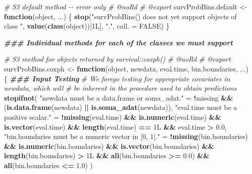 \documentclass[
]{book}
\newenvironment{Shaded}{\begin{snugshade}}{\end{snugshade}}
\newcommand{\AttributeTok}[1]{\textcolor[rgb]{0.13,0.29,0.53}{#1}}
\newcommand{\CommentTok}[1]{\textcolor[rgb]{0.56,0.35,0.01}{\textit{#1}}}
\newcommand{\ConstantTok}[1]{\textcolor[rgb]{0.56,0.35,0.01}{#1}}
\newcommand{\ControlFlowTok}[1]{\textcolor[rgb]{0.13,0.29,0.53}{\textbf{#1}}}
\newcommand{\DocumentationTok}[1]{\textcolor[rgb]{0.56,0.35,0.01}{\textbf{\textit{#1}}}}
\newcommand{\FloatTok}[1]{\textcolor[rgb]{0.00,0.00,0.81}{#1}}
\newcommand{\FunctionTok}[1]{\textcolor[rgb]{0.13,0.29,0.53}{\textbf{#1}}}
\newcommand{\NormalTok}[1]{#1}
\newcommand{\OtherTok}[1]{\textcolor[rgb]{0.56,0.35,0.01}{#1}}
\newcommand{\SpecialCharTok}[1]{\textcolor[rgb]{0.81,0.36,0.00}{\textbf{#1}}}
\newcommand{\StringTok}[1]{\textcolor[rgb]{0.31,0.60,0.02}{#1}}
\begin{document}
\begin{Shaded}
\begin{Highlighting}[]
\CommentTok{\#\textquotesingle{} S3 default method {-}{-} error only}
\CommentTok{\#\textquotesingle{} @noRd}
\CommentTok{\#\textquotesingle{} @export}
\NormalTok{survProbBins.default }\OtherTok{\textless{}{-}} \ControlFlowTok{function}\NormalTok{(object, ...) \{}
  \FunctionTok{stop}\NormalTok{(}\StringTok{"\textasciigrave{}survProbBins()\textasciigrave{} does not yet support objects of class "}\NormalTok{,}
       \FunctionTok{value}\NormalTok{(}\FunctionTok{class}\NormalTok{(object))[1L], }\StringTok{"."}\NormalTok{, }\AttributeTok{call. =} \ConstantTok{FALSE}\NormalTok{)}
\NormalTok{\}}

\DocumentationTok{\#\#\# Individual methods for each of the classes we must support}

\CommentTok{\#\textquotesingle{} S3 method for objects returned by \textasciigrave{}survival::coxph()\textasciigrave{}}
\CommentTok{\#\textquotesingle{} @noRd}
\CommentTok{\#\textquotesingle{} @export}
\NormalTok{survProbBins.coxph }\OtherTok{\textless{}{-}} \ControlFlowTok{function}\NormalTok{(object, newdata, eval.time, bin.boundaries, ...) \{}
  \DocumentationTok{\#\#\# Input Testing}
  \CommentTok{\# We forego testing for appropriate covariates in \textasciigrave{}newdata\textasciigrave{}, which will}
  \CommentTok{\#   be inherent in the procedure used to obtain predictions}
  \FunctionTok{stopifnot}\NormalTok{(}
    \StringTok{"\textasciigrave{}newdata\textasciigrave{} must be a data.frame or soma\_adat."} \OtherTok{=} 
      \SpecialCharTok{!}\NormalTok{missing }\SpecialCharTok{\&\&}\NormalTok{ (}\FunctionTok{is.data.frame}\NormalTok{(newdata) }\SpecialCharTok{||} \FunctionTok{is.soma\_adat}\NormalTok{(newdata)),}
    \StringTok{"\textasciigrave{}eval.time\textasciigrave{} must be a positive scalar."} \OtherTok{=} 
      \SpecialCharTok{!}\FunctionTok{missing}\NormalTok{(eval.time) }\SpecialCharTok{\&\&} \FunctionTok{is.numeric}\NormalTok{(eval.time) }\SpecialCharTok{\&\&} 
        \FunctionTok{is.vector}\NormalTok{(eval.time) }\SpecialCharTok{\&\&} \FunctionTok{length}\NormalTok{(eval.time) }\SpecialCharTok{==}\NormalTok{ 1L }\SpecialCharTok{\&\&}\NormalTok{ eval.time }\SpecialCharTok{\textgreater{}} \FloatTok{0.0}\NormalTok{,}
    \StringTok{"\textasciigrave{}bin.boundaries\textasciigrave{} must be a numeric vector in [0, 1]."} \OtherTok{=} 
      \SpecialCharTok{!}\FunctionTok{missing}\NormalTok{(bin.boundaries) }\SpecialCharTok{\&\&} \FunctionTok{is.numeric}\NormalTok{(bin.boundaries) }\SpecialCharTok{\&\&} 
        \FunctionTok{is.vector}\NormalTok{(bin.boundaries) }\SpecialCharTok{\&\&} \FunctionTok{length}\NormalTok{(bin.boundaries) }\SpecialCharTok{\textgreater{}}\NormalTok{ 1L }\SpecialCharTok{\&\&} 
        \FunctionTok{all}\NormalTok{(bin.boundaries }\SpecialCharTok{\textgreater{}=} \FloatTok{0.0}\NormalTok{) }\SpecialCharTok{\&\&} \FunctionTok{all}\NormalTok{(bin.boundaries }\SpecialCharTok{\textless{}=} \FloatTok{1.0}\NormalTok{)}
\NormalTok{  )}
  

\end{Highlighting}
\end{Shaded}
\end{document}
